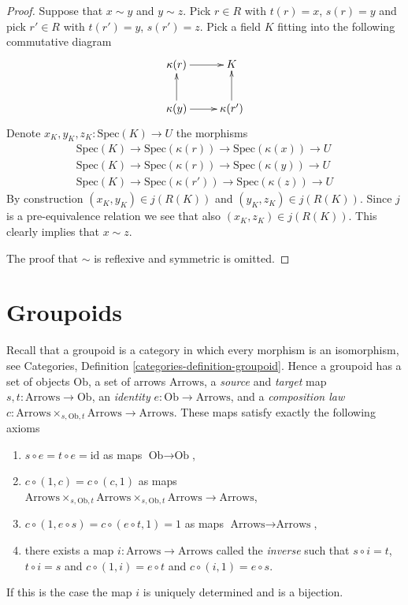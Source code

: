 \begin{proof}
Suppose that $x \sim y$ and $y \sim z$.
Pick $r \in R$ with $t(r) = x$, $s(r) = y$ and
pick $r' \in R$ with $t(r') = y$, $s(r') = z$.
Pick a field $K$ fitting into the following commutative
diagram
$$
\xymatrix{
\kappa(r) \ar[r] & K \\
\kappa(y) \ar[u] \ar[r] & \kappa(r') \ar[u]
}
$$
Denote $x_K, y_K, z_K : \text{Spec}(K) \to U$
the morphisms
$$
\begin{matrix}
\text{Spec}(K) \to \text{Spec}(\kappa(r))
\to 
\text{Spec}(\kappa(x)) \to U \\
\text{Spec}(K) \to \text{Spec}(\kappa(r))
\to
\text{Spec}(\kappa(y)) \to U \\
\text{Spec}(K) \to \text{Spec}(\kappa(r'))
\to
\text{Spec}(\kappa(z)) \to U
\end{matrix}
$$
By construction $(x_K, y_K) \in j(R(K))$ and
$(y_K, z_K) \in j(R(K))$. Since $j$ is a pre-equivalence relation
we see that also $(x_K, z_K) \in j(R(K))$.
This clearly implies that $x \sim z$.

\medskip\noindent
The proof that $\sim$ is reflexive and symmetric is omitted.
\end{proof}











\section{Groupoids}
\label{section-groupoids}

\noindent
Recall that a groupoid is a category in which every morphism
is an isomorphism, see
Categories, Definition \ref{categories-definition-groupoid}.
Hence a groupoid has a set of objects $\text{Ob}$,
a set of arrows $\text{Arrows}$, a {\it source} and {\it target}
map $s, t : \text{Arrows} \to \text{Ob}$,
an {\it identity} $e : \text{Ob} \to \text{Arrows}$,
and  a {\it composition law}
$c : \text{Arrows} \times_{s, \text{Ob}, t} \text{Arrows}
\to \text{Arrows}$.
These maps satisfy exactly the following axioms
\begin{enumerate}
\item $s \circ e = t \circ e = \text{id}$ as maps $\text{Ob} \to \text{Ob}$,
\item $c \circ (1, c) = c \circ (c, 1)$ as maps
$\text{Arrows} \times_{s, \text{Ob}, t}
\text{Arrows} \times_{s, \text{Ob}, t}
\text{Arrows} \to \text{Arrows}$,
\item $c \circ (1, e \circ s) = c \circ (e \circ t, 1) = 1$
as maps $\text{Arrows} \to \text{Arrows}$,
\item there exists a map $i : \text{Arrows} \to \text{Arrows}$
called the {\it inverse} such that $s \circ i = t$, $t \circ i = s$ and
$c \circ (1, i) = e \circ t$ and
$c \circ (i, 1) = e \circ s$.
\end{enumerate}
If this is the case the map $i$ is uniquely determined and
is a bijection.

